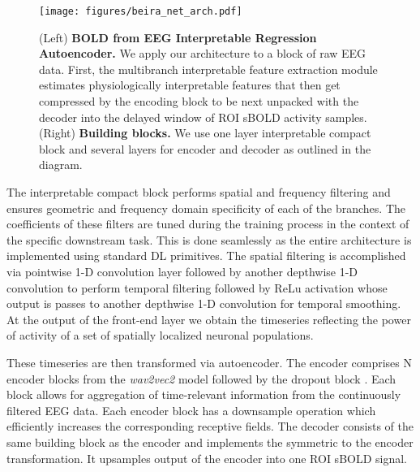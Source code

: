 \documentclass{article}
\begin{document}
\begin{figure}[ht]
    \centering
    \texttt{[image: figures/beira\_net\_arch.pdf]}
    \caption{\label{fig:model}(Left) \textbf{BOLD from EEG Interpretable Regression Autoencoder.} 
    We apply our architecture to a block of raw EEG data. First, the multibranch interpretable feature extraction module estimates physiologically interpretable features that then get compressed by the encoding block to be next unpacked with the decoder into the delayed window of ROI sBOLD activity samples.
    \newline
(Right) \textbf{Building blocks.} We use one layer interpretable compact block and several layers for encoder and decoder as outlined in the diagram.}
\end{figure}

The interpretable compact block performs spatial and frequency filtering and ensures geometric and frequency domain specificity of each of the branches. The coefficients of these filters are tuned during the training process in the context of the specific downstream task. This is done seamlessly as the entire architecture is implemented using standard DL primitives. The spatial filtering is accomplished via pointwise 1-D convolution layer followed by another depthwise 1-D convolution to perform temporal filtering followed by ReLu activation whose output is passes to another depthwise 1-D convolution for temporal smoothing. At the output of the front-end layer we obtain the timeseries reflecting the power of activity of a set of spatially localized neuronal populations. 

These timeseries are then transformed via autoencoder. The encoder comprises N encoder blocks from the \textit{wav2vec2} model \cite{wav2vec2}  followed by the dropout block \cite{dropout}. Each block allows for aggregation of time-relevant information from the continuously filtered EEG data. Each encoder block has a downsample operation which efficiently increases the corresponding receptive fields. The decoder consists of the same building block as the encoder and implements the symmetric to the encoder transformation. It upsamples output of the encoder into one ROI sBOLD signal.
\end{document}
